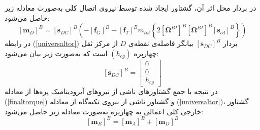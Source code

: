  در بردار محل اثر آن، گشتاور ایجاد شده
توسط نیروی اتصال کلی به‌صورت معادله زیر حاصل می‌شود:
\begin{equation}\label{universaltor}
	\left[\boldsymbol m_D\right]^B = \left[\boldsymbol s_{DC}\right]^B\left(
	-\left[\boldsymbol f_G\right]^B
	-\left[\boldsymbol f_T\right]^B
	m_{tot}\left\{2
	\left[\boldsymbol \Omega^{BI}\right]^B
	\left[\boldsymbol \Omega^{BI}\right]^B
	\left[\boldsymbol s_{cd}\right]^B
	\right\}
	\right)
\end{equation}
در رابطه
(\ref{universaltor})
بردار 
$\left[\boldsymbol s_{DC}\right]^B$
بیانگر فاصله‌ی نقطه‌ی 
$D$
از مرکز ثقل چهارپره 
$(h_{cg})$
است که به‌صورت زیر بیان می‌شود:
\begin{equation}
	\left[\boldsymbol s_{DC}\right]^B = \begin{bmatrix}
		0\\0\\h_{cg}
	\end{bmatrix}
\end{equation}
 در نتیجه با جمع گشتاورهای ناشی از نیروهای آیرودینامیک پره‌ها از معادله 
(\ref{finaltorque})
 و گشتاور ناشی 
از نیروی تكیه‌گاه از معادله 
(\ref{universaltor})، گشتاور خارجی کلی اعمالی به چهارپره به‌صورت معادله زیر حاصل 
می‌شود:
\begin{equation}\label{finalm}
	\left[\boldsymbol m_B\right]^B = 
	\left[\boldsymbol m_A\right]^B+
	\left[\boldsymbol m_D\right]^B
\end{equation}

